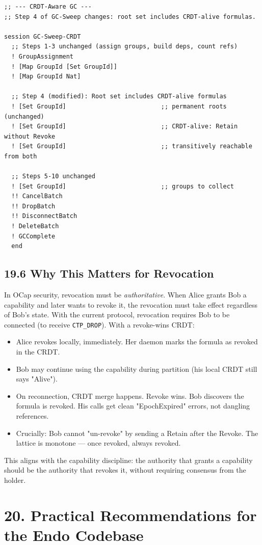 \documentclass[11pt]{article}
\begin{document}
\begin{verbatim}
;; --- CRDT-Aware GC ---
;; Step 4 of GC-Sweep changes: root set includes CRDT-alive formulas.

session GC-Sweep-CRDT
  ;; Steps 1-3 unchanged (assign groups, build deps, count refs)
  ! GroupAssignment
  ! [Map GroupId [Set GroupId]]
  ! [Map GroupId Nat]

  ;; Step 4 (modified): Root set includes CRDT-alive formulas
  ! [Set GroupId]                          ;; permanent roots (unchanged)
  ! [Set GroupId]                          ;; CRDT-alive: Retain without Revoke
  ! [Set GroupId]                          ;; transitively reachable from both

  ;; Steps 5-10 unchanged
  ! [Set GroupId]                          ;; groups to collect
  !! CancelBatch
  !! DropBatch
  !! DisconnectBatch
  ! DeleteBatch
  ! GCComplete
  end
\end{verbatim}
\subsection{19.6 Why This Matters for Revocation}
\label{sec:org54a8e47}

In OCap security, revocation must be \emph{authoritative}. When Alice grants Bob
a capability and later wants to revoke it, the revocation must take effect
regardless of Bob's state. With the current protocol, revocation requires
Bob to be connected (to receive \texttt{CTP\_DROP}). With a revoke-wins CRDT:

\begin{itemize}
\item Alice revokes locally, immediately. Her daemon marks the formula as
revoked in the CRDT.
\item Bob may continue using the capability during partition (his local CRDT
still says "Alive").
\item On reconnection, CRDT merge happens. Revoke wins. Bob discovers the
formula is revoked. His calls get clean "EpochExpired" errors, not
dangling references.
\item Crucially: Bob cannot "un-revoke" by sending a Retain after the Revoke.
The lattice is monotone --- once revoked, always revoked.
\end{itemize}

This aligns with the capability discipline: the authority that grants a
capability should be the authority that revokes it, without requiring
consensus from the holder.
\section{20. Practical Recommendations for the Endo Codebase}
\label{sec:org5b63d8d}
\end{document}
